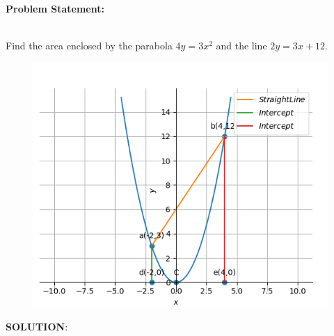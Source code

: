 \documentclass[10pt,a4paper]{report}
\begin{document}
\begin{multicols}{2}

\raggedright \textbf{Problem Statement:}\vspace{2mm}
\raggedright \\
\fi
	Find the area enclosed by the parabola $4y=3x^2 $ and the line $2y=3x+12$.\\
	\solution
	\begin{figure}[!h]
		\centering
 \includegraphics[width=\columnwidth]{chapters/12/8/3/7/figs/conic.png}
		\caption{}
		\label{fig:12/8/3/7}
  	\end{figure}
\iffalse
\vspace{5mm}
\raggedright \textbf{SOLUTION}:\vspace{2mm}\\


\end{multicols}
\end{document}
